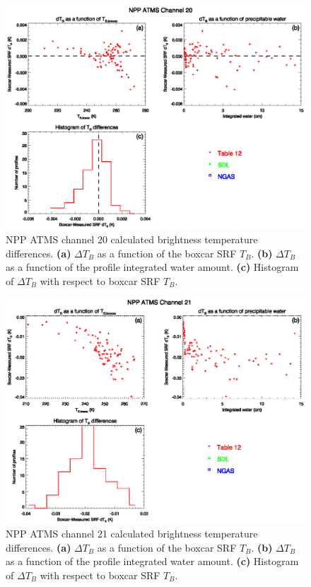 \begin{figure}[H]
  \centering
  \includegraphics[scale=1]{graphics/dtb/atms_npp.ch20.TbStats.eps}
  \caption{NPP ATMS channel 20 calculated brightness temperature differences. \textbf{(a)} $\Delta T_B$ as a function of the boxcar SRF $T_B$. \textbf{(b)} $\Delta T_B$ as a function of the profile integrated water amount. \textbf{(c)} Histogram of $\Delta T_B$ with respect to boxcar SRF $T_B$.}
  \label{fig:atms_npp.ch20.dtb}
\end{figure}

\begin{figure}[H]
  \centering
  \includegraphics[scale=1]{graphics/dtb/atms_npp.ch21.TbStats.eps}
  \caption{NPP ATMS channel 21 calculated brightness temperature differences. \textbf{(a)} $\Delta T_B$ as a function of the boxcar SRF $T_B$. \textbf{(b)} $\Delta T_B$ as a function of the profile integrated water amount. \textbf{(c)} Histogram of $\Delta T_B$ with respect to boxcar SRF $T_B$.}
  \label{fig:atms_npp.ch21.dtb}
\end{figure}


